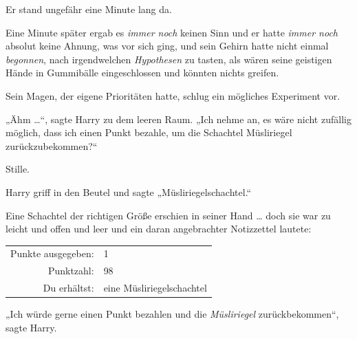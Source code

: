Er stand ungefähr eine Minute lang da.

Eine Minute später ergab es \emph{immer noch} keinen Sinn und er hatte \emph{immer noch} absolut keine Ahnung, was vor sich ging, und sein Gehirn hatte nicht einmal \emph{begonnen}, nach irgendwelchen \emph{Hypothesen} zu tasten, als wären seine geistigen Hände in Gummibälle eingeschlossen und könnten nichts greifen.

Sein Magen, der eigene Prioritäten hatte, schlug ein mögliches Experiment vor.

„Ähm …“, sagte Harry zu dem leeren Raum.
„Ich nehme an, es wäre nicht zufällig möglich, dass ich einen Punkt bezahle, um die Schachtel Müsliriegel zurückzubekommen?“

Stille.

Harry griff in den Beutel und sagte
„Müsliriegelschachtel.“

Eine Schachtel der richtigen Größe erschien in seiner Hand … doch sie war zu leicht und offen und leer und ein daran angebrachter Notizzettel lautete:
\begin{writtenNote}
\begin{tabular}{rl}
Punkte ausgegeben: & 1\\
Punktzahl: & 98\\
Du erhältst: & eine Müsliriegelschachtel
\end{tabular}
\end{writtenNote}

„Ich würde gerne einen Punkt bezahlen und die \emph{Müsliriegel} zurückbekommen“, sagte Harry.


